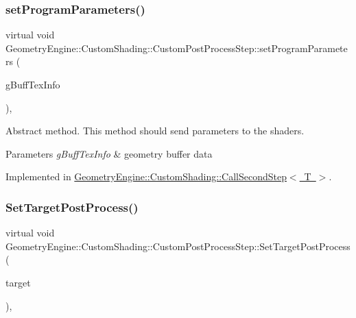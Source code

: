 \subsubsection{\texorpdfstring{setProgramParameters()}{setProgramParameters()}}
{\footnotesize\ttfamily virtual void Geometry\+Engine\+::\+Custom\+Shading\+::\+Custom\+Post\+Process\+Step\+::set\+Program\+Parameters (\begin{DoxyParamCaption}\item[{const \mbox{\hyperlink{class_geometry_engine_1_1_g_buffer_texture_info}{G\+Buffer\+Texture\+Info}} \&}]{g\+Buff\+Tex\+Info }\end{DoxyParamCaption})\hspace{0.3cm}{\ttfamily [protected]}, {}}

Abstract method. This method should send parameters to the shaders. 
\begin{DoxyParams}{Parameters}
{\em g\+Buff\+Tex\+Info} & geometry buffer data \\
\hline
\end{DoxyParams}


Implemented in \mbox{\hyperlink{class_geometry_engine_1_1_custom_shading_1_1_call_second_step_a31dfe9d64b6d938367f2adeecc1d37bb}{Geometry\+Engine\+::\+Custom\+Shading\+::\+Call\+Second\+Step$<$ T $>$}}.

\mbox{\label{class_geometry_engine_1_1_custom_shading_1_1_custom_post_process_step_a44bb875476cb93976309a588bc9cb1c6}} 
\subsubsection{\texorpdfstring{SetTargetPostProcess()}{SetTargetPostProcess()}}
{\footnotesize\ttfamily virtual void Geometry\+Engine\+::\+Custom\+Shading\+::\+Custom\+Post\+Process\+Step\+::\+Set\+Target\+Post\+Process (\begin{DoxyParamCaption}\item[{\mbox{\hyperlink{class_geometry_engine_1_1_geometry_post_process_1_1_post_process}{Geometry\+Post\+Process\+::\+Post\+Process}} $\ast$}]{target }\end{DoxyParamCaption})\hspace{0.3cm}{\ttfamily [inline]}, {\ttfamily [virtual]}}

